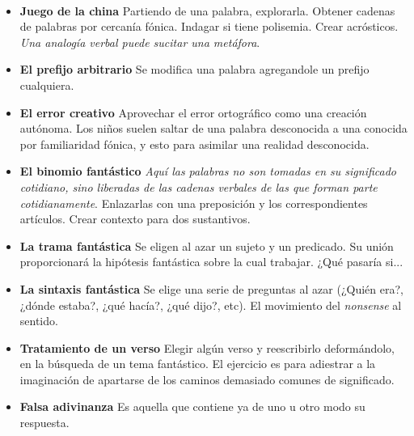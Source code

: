 \\[0.1cm]

\begin{itemize}
	\item {\bf Juego de la china} Partiendo de una palabra, explorarla. Obtener cadenas de palabras por cercanía fónica. Indagar si tiene polisemia. Crear acrósticos. {\it Una analogía verbal puede sucitar una metáfora}.
	\item {\bf El prefijo arbitrario} Se modifica una palabra agregandole un prefijo cualquiera.
	\item {\bf El error creativo} Aprovechar el error ortográfico como una creación autónoma. Los niños suelen saltar de una palabra desconocida a una conocida por familiaridad fónica, y esto para asimilar una realidad desconocida.
	\item {\bf El binomio fantástico} {\it Aquí las palabras no son tomadas en su significado cotidiano, sino liberadas de las cadenas verbales de las que forman parte cotidianamente}. Enlazarlas con una preposición y los correspondientes artículos. Crear contexto para dos sustantivos.
	\item {\bf La trama fantástica} Se eligen al azar un sujeto y un predicado. Su unión proporcionará la hipótesis fantástica sobre la cual trabajar. ¿Qué pasaría si...
	\item {\bf La sintaxis fantástica} Se elige una serie de preguntas al azar (¿Quién era?, ¿dónde estaba?, ¿qué hacía?, ¿qué dijo?, etc). El movimiento del {\it nonsense} al sentido.
	\item {\bf Tratamiento de un verso} Elegir algún verso y reescribirlo deformándolo, en la búsqueda de un tema fantástico. El ejercicio es para adiestrar a la imaginación de apartarse de los caminos demasiado comunes de significado.
	\item {\bf Falsa adivinanza} Es aquella que contiene ya de uno u otro modo su respuesta.


\end{itemize}
